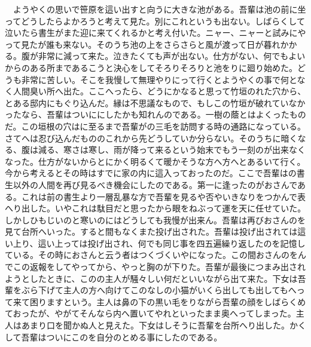 \documentclass[a5j]{ltjtbook}
\begin{document}
　ようやくの思いで笹原を這い出すと向うに大きな池がある。吾輩は池の前に坐ってどうしたらよかろうと考えて見た。別にこれというも出ない。しばらくして泣いたら書生がまた迎に来てくれるかと考え付いた。ニャー、ニャーと試みにやって見たが誰も来ない。そのうち池の上をさらさらと風が渡って日が暮れかかる。腹が非常に減って来た。泣きたくても声が出ない。仕方がない、何でもよいからのある所まであるこうと決心をしてそろりそろりと池をりに廻り始めた。どうも非常に苦しい。そこを我慢して無理やりにって行くとようやくの事で何となく人間臭い所へ出た。ここへったら、どうにかなると思って竹垣のれた穴から、とある邸内にもぐり込んだ。縁は不思議なもので、もしこの竹垣が破れていなかったなら、吾輩はついににしたかも知れんのである。一樹の蔭とはよくったものだ。この垣根の穴はに至るまで吾輩がの三毛を訪問する時の通路になっている。さてへは忍び込んだもののこれから先どうしていか分らない。そのうちに暗くなる、腹は減る、寒さは寒し、雨が降って来るという始末でもう一刻のが出来なくなった。仕方がないからとにかく明るくて暖かそうな方へ方へとあるいて行く。今から考えるとその時はすでに家の内に這入っておったのだ。ここで吾輩はの書生以外の人間を再び見るべき機会にしたのである。第一に逢ったのがおさんである。これは前の書生より一層乱暴な方で吾輩を見るや否やいきなりをつかんで表へり出した。いやこれは駄目だと思ったから眼をねぶって運を天に任せていた。しかしひもじいのと寒いのにはどうしても我慢が出来ん。吾輩は再びおさんのを見て台所へいった。すると間もなくまた投げ出された。吾輩は投げ出されては這い上り、這い上っては投げ出され、何でも同じ事を四五遍繰り返したのを記憶している。その時におさんと云う者はつくづくいやになった。この間おさんのをんでこの返報をしてやってから、やっと胸のが下りた。吾輩が最後につまみ出されようとしたときに、このの主人が騒々しい何だといいながら出て来た。下女は吾輩をぶら下げて主人の方へ向けてこのなしの小猫がいくら出しても出してもへって来て困りますという。主人は鼻の下の黒い毛をりながら吾輩の顔をしばらくめておったが、やがてそんなら内へ置いてやれといったまま奥へってしまった。主人はあまり口を聞かぬ人と見えた。下女はしそうに吾輩を台所へり出した。かくして吾輩はついにこのを自分のとめる事にしたのである。 \newline
\end{document}
